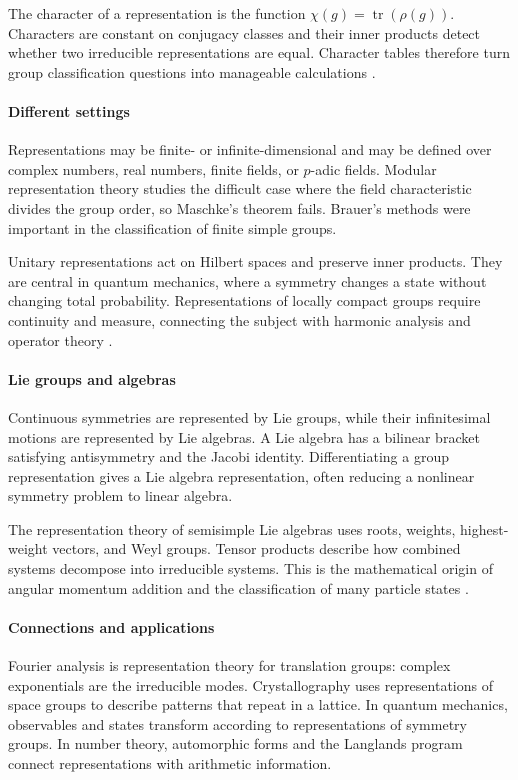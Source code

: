 The character of a representation is the function $\chi(g)=\operatorname{tr}(\rho(g))$. Characters are constant on conjugacy classes and their inner products detect whether two irreducible representations are equal. Character tables therefore turn group classification questions into manageable calculations \cite{representation_ref1}.

\paragraph{Different settings}
Representations may be finite- or infinite-dimensional and may be defined over complex numbers, real numbers, finite fields, or $p$-adic fields. Modular representation theory studies the difficult case where the field characteristic divides the group order, so Maschke's theorem fails. Brauer's methods were important in the classification of finite simple groups.

Unitary representations act on Hilbert spaces and preserve inner products. They are central in quantum mechanics, where a symmetry changes a state without changing total probability. Representations of locally compact groups require continuity and measure, connecting the subject with harmonic analysis and operator theory \cite{representation_ref2}.

\paragraph{Lie groups and algebras}
Continuous symmetries are represented by Lie groups, while their infinitesimal motions are represented by Lie algebras. A Lie algebra has a bilinear bracket satisfying antisymmetry and the Jacobi identity. Differentiating a group representation gives a Lie algebra representation, often reducing a nonlinear symmetry problem to linear algebra.

The representation theory of semisimple Lie algebras uses roots, weights, highest-weight vectors, and Weyl groups. Tensor products describe how combined systems decompose into irreducible systems. This is the mathematical origin of angular momentum addition and the classification of many particle states \cite{representation_ref3}.

\paragraph{Connections and applications}
Fourier analysis is representation theory for translation groups: complex exponentials are the irreducible modes. Crystallography uses representations of space groups to describe patterns that repeat in a lattice. In quantum mechanics, observables and states transform according to representations of symmetry groups. In number theory, automorphic forms and the Langlands program connect representations with arithmetic information.

